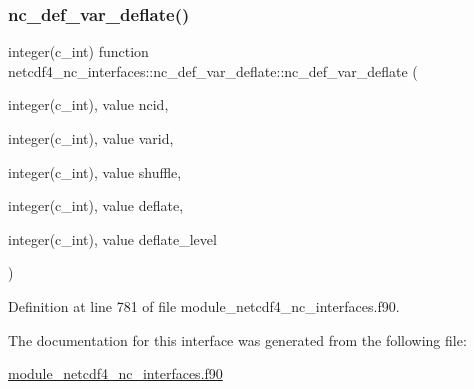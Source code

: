 \subsubsection{\texorpdfstring{nc\+\_\+def\+\_\+var\+\_\+deflate()}{nc\_def\_var\_deflate()}}
{\footnotesize\ttfamily integer(c\+\_\+int) function netcdf4\+\_\+nc\+\_\+interfaces\+::nc\+\_\+def\+\_\+var\+\_\+deflate\+::nc\+\_\+def\+\_\+var\+\_\+deflate (\begin{DoxyParamCaption}\item[{integer(c\+\_\+int), value}]{ncid,  }\item[{integer(c\+\_\+int), value}]{varid,  }\item[{integer(c\+\_\+int), value}]{shuffle,  }\item[{integer(c\+\_\+int), value}]{deflate,  }\item[{integer(c\+\_\+int), value}]{deflate\+\_\+level }\end{DoxyParamCaption})}



Definition at line 781 of file module\+\_\+netcdf4\+\_\+nc\+\_\+interfaces.\+f90.



The documentation for this interface was generated from the following file\+:\begin{DoxyCompactItemize}
\item 
\hyperlink{module__netcdf4__nc__interfaces_8f90}{module\+\_\+netcdf4\+\_\+nc\+\_\+interfaces.\+f90}\end{DoxyCompactItemize}
